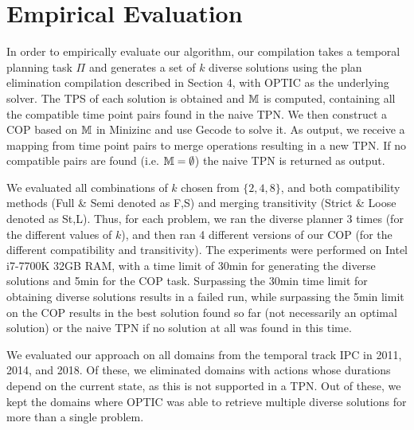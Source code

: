 \section{Empirical Evaluation}
In order to empirically evaluate our algorithm, our compilation takes a temporal planning task $\Pi$ and generates a set of $k$ diverse solutions using the plan elimination compilation described in Section 4, with OPTIC \cite{benton2012temporal} as the underlying solver. The TPS of each solution is obtained and $\mathbb{M}$ is computed, containing all the compatible time point pairs found in the naive TPN.
We then construct a COP based on $\mathbb{M}$ in Minizinc \cite{nethercote2007minizinc} and use Gecode \cite{gecode} to solve it. As output, we receive a mapping from time point pairs to merge operations resulting in a new TPN.
If no compatible pairs are found (i.e. $\mathbb{M} = \emptyset$) the naive TPN is returned as output. 


We evaluated all combinations of $k$ chosen from $\{2,4,8\}$, and both compatibility methods 
(Full \& Semi denoted as F,S) and merging transitivity (Strict \& Loose denoted as St,L). Thus, for each problem, we ran the diverse planner 3 times (for the different values of $k$), and then ran 4 different versions of our COP (for the different compatibility and transitivity). The experiments were performed on Intel i7-7700K 32GB RAM, with a time limit of 30min for generating the diverse solutions and 5min for the COP task.
Surpassing the 30min time limit for obtaining diverse solutions results in a failed run, while surpassing the 5min limit on the COP results in the best solution found so far (not necessarily an optimal solution) or the naive TPN if no solution at all was found in this time.
 


We evaluated our approach on all domains from the temporal track IPC in 2011, 2014, and 2018. Of these, we eliminated domains with actions whose durations depend on the current state, as this is not supported in a TPN.
Out of these, we kept the domains where OPTIC was able to retrieve multiple diverse solutions for more than a single problem.


